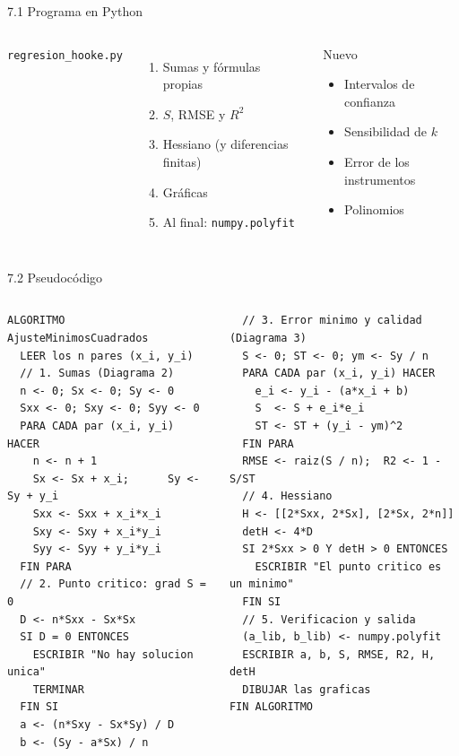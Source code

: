\documentclass[aspectratio=169,11pt]{beamer}
\begin{document}
\begin{frame}{7.1 Programa en Python}
  \begin{columns}[T]
    \texttt{regresion\_hooke.py}
    \begin{enumerate}\small
      \item Sumas y fórmulas propias
      \item $S$, RMSE y $R^2$
      \item Hessiano (y diferencias finitas)
      \item Gráficas
      \item Al final: \texttt{numpy.polyfit}
    \end{enumerate}
    \begin{block}{Nuevo}
      \small
      \begin{itemize}
        \item Intervalos de confianza
        \item Sensibilidad de $k$
        \item Error de los instrumentos
        \item Polinomios
      \end{itemize}
    \end{block}
  \end{columns}
\end{frame}

\begin{frame}[fragile]{7.2 Pseudocódigo}
  \begin{columns}[T]
\begin{lstlisting}
ALGORITMO AjusteMinimosCuadrados
  LEER los n pares (x_i, y_i)
  // 1. Sumas (Diagrama 2)
  n <- 0; Sx <- 0; Sy <- 0
  Sxx <- 0; Sxy <- 0; Syy <- 0
  PARA CADA par (x_i, y_i) HACER
    n <- n + 1
    Sx <- Sx + x_i;      Sy <- Sy + y_i
    Sxx <- Sxx + x_i*x_i
    Sxy <- Sxy + x_i*y_i
    Syy <- Syy + y_i*y_i
  FIN PARA
  // 2. Punto critico: grad S = 0
  D <- n*Sxx - Sx*Sx
  SI D = 0 ENTONCES
    ESCRIBIR "No hay solucion unica"
    TERMINAR
  FIN SI
  a <- (n*Sxy - Sx*Sy) / D
  b <- (Sy - a*Sx) / n
\end{lstlisting}
\begin{lstlisting}
  // 3. Error minimo y calidad (Diagrama 3)
  S <- 0; ST <- 0; ym <- Sy / n
  PARA CADA par (x_i, y_i) HACER
    e_i <- y_i - (a*x_i + b)
    S  <- S + e_i*e_i
    ST <- ST + (y_i - ym)^2
  FIN PARA
  RMSE <- raiz(S / n);  R2 <- 1 - S/ST
  // 4. Hessiano
  H <- [[2*Sxx, 2*Sx], [2*Sx, 2*n]]
  detH <- 4*D
  SI 2*Sxx > 0 Y detH > 0 ENTONCES
    ESCRIBIR "El punto critico es un minimo"
  FIN SI
  // 5. Verificacion y salida
  (a_lib, b_lib) <- numpy.polyfit
  ESCRIBIR a, b, S, RMSE, R2, H, detH
  DIBUJAR las graficas
FIN ALGORITMO
\end{lstlisting}
  \end{columns}
\end{frame}
\end{document}
